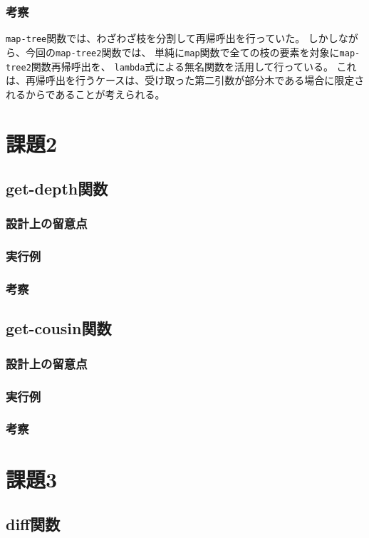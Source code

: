\documentclass[11pt,a4paper, uplatex]{jsarticle}
\begin{document}
\subsubsection{考察}
\texttt{map-tree}関数では、わざわざ枝を分割して再帰呼出を行っていた。
しかしながら、今回の\texttt{map-tree2}関数では、
単純に\texttt{map}関数で全ての枝の要素を対象に\texttt{map-tree2}関数再帰呼出を、
\texttt{lambda}式による無名関数を活用して行っている。
これは、再帰呼出を行うケースは、受け取った第二引数が部分木である場合に限定されるからであることが考えられる。


\section{課題2}
\subsection{get-depth関数}
\subsubsection{設計上の留意点}
\subsubsection{実行例}
\subsubsection{考察}

\subsection{get-cousin関数}
\subsubsection{設計上の留意点}
\subsubsection{実行例}
\subsubsection{考察}


\section{課題3}
\subsection{diff関数}
\end{document}
